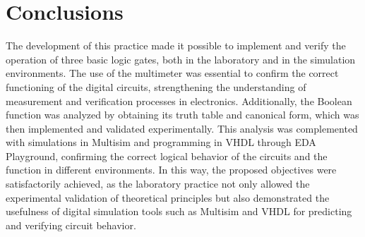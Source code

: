 \documentclass[12pt]{article}  %
\begin{document}
\section{Conclusions} %
The development of this practice made it possible to implement and verify the operation of three basic logic gates, both in the laboratory and in the simulation environments. The use of the multimeter was essential to confirm the correct functioning of the digital circuits, strengthening the understanding of measurement and verification processes in electronics.
Additionally, the Boolean function was analyzed by obtaining its truth table and canonical form, which was then implemented and validated experimentally. This analysis was complemented with simulations in Multisim and programming in VHDL through EDA Playground, confirming the correct logical behavior of the circuits and the function in different environments.
In this way, the proposed objectives were satisfactorily achieved, as the laboratory practice not only allowed the experimental validation of theoretical principles but also demonstrated the usefulness of digital simulation tools such as Multisim and VHDL for predicting and verifying circuit behavior.

\clearpage %
\end{document}
